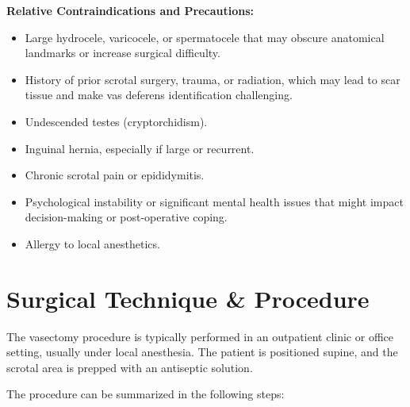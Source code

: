 \textbf{Relative Contraindications and Precautions:}
\begin{itemize}
  \item Large hydrocele, varicocele, or spermatocele that may obscure anatomical landmarks or increase surgical difficulty.
  \item History of prior scrotal surgery, trauma, or radiation, which may lead to scar tissue and make vas deferens identification challenging.
  \item Undescended testes (cryptorchidism).
  \item Inguinal hernia, especially if large or recurrent.
  \item Chronic scrotal pain or epididymitis.
  \item Psychological instability or significant mental health issues that might impact decision-making or post-operative coping.
  \item Allergy to local anesthetics.
\end{itemize}

\section*{Surgical Technique \& Procedure}
The vasectomy procedure is typically performed in an outpatient clinic or office setting, usually under local anesthesia. The patient is positioned supine, and the scrotal area is prepped with an antiseptic solution.

The procedure can be summarized in the following steps:

